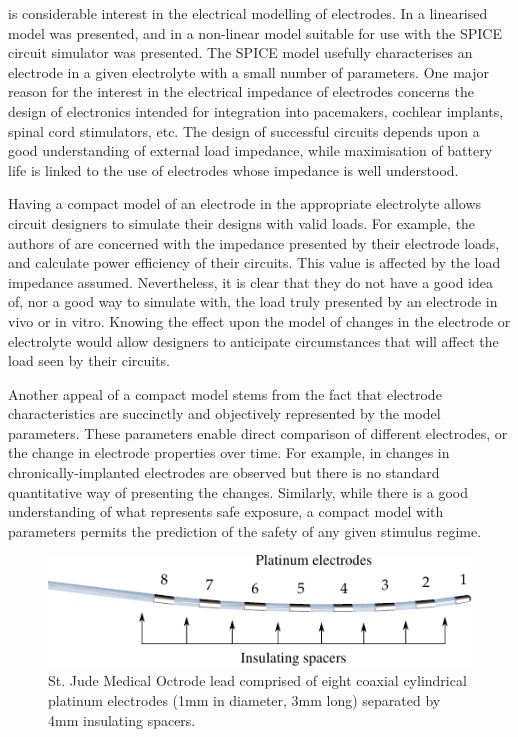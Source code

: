 \documentclass[journal, a4paper]{IEEEtran}
\begin{document}
 is considerable interest in the electrical modelling of electrodes. \cite{Cogan2008,Brown2008,Guo2012,Troy2006}
In \cite{Franks2005} a linearised model was presented, and in \cite{ScottSingle2013} a non-linear model
suitable for use with the SPICE circuit simulator was presented.
The SPICE model usefully characterises an electrode in a given electrolyte with a small number of parameters.
One major reason for the interest in the electrical impedance of electrodes concerns the design of electronics intended for integration into pacemakers, cochlear implants, spinal cord stimulators, etc.
The design of successful circuits depends upon a good understanding of external load impedance, while maximisation of battery life is linked to the use of electrodes whose impedance is well understood.

Having a compact model of an electrode in the appropriate electrolyte allows circuit designers to simulate their designs with valid loads.
{
    \color{blue}
For example, the authors of \cite{Ethier2011} are concerned with the impedance presented by their electrode loads, and calculate power efficiency of their circuits.
This value is affected by the load impedance assumed.
Nevertheless, it is clear that they do not have a good idea of, nor a good way to simulate with, the load truly presented by an electrode in vivo or in vitro.
}
Knowing the effect upon the model of changes in the electrode or electrolyte would allow designers to anticipate circumstances that will affect the load seen by their circuits. 

Another appeal of a compact model stems from the fact that electrode characteristics are succinctly and objectively represented by the model parameters.
These parameters enable direct comparison of different electrodes, or the change in electrode properties over time.
For example, in \cite{Kane13} changes in chronically-implanted electrodes are observed but there is no standard quantitative way of presenting the changes.
Similarly, while there is a good understanding of what represents safe exposure, a compact model with parameters permits the prediction of the safety of any given stimulus regime.~\cite{Merrill05}

\begin{figure}
    \begin{center}
    \includegraphics{graphics/StJudeOctrodeDiagram}
    \end{center}
    \caption{St. Jude Medical Octrode lead comprised of eight coaxial cylindrical platinum electrodes (1mm in diameter, 3mm long) separated by 4mm insulating spacers.}
    \label{fig:octrode}
\end{figure}
\end{document}
